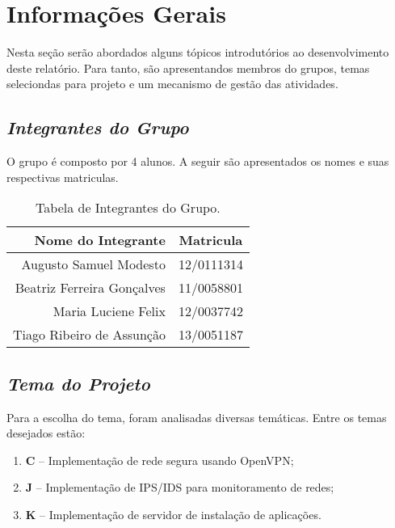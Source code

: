 \chapter[Informações Gerais]{Informações Gerais}
\label{chap:informacoesGerais}
	
	Nesta seção serão abordados alguns tópicos introdutórios ao desenvolvimento deste relatório. Para tanto, são apresentandos membros do grupos, temas seleciondas para projeto e um mecanismo de gestão das atividades.

	\section[Integrantes do Grupo]{\emph{Integrantes do Grupo}}
	\label{sec:informacoesGerais_integrantes}

		O grupo é composto por 4 alunos. A seguir são apresentados os nomes e suas respectivas matriculas.

		\label{subsubsec:informacoesGerais_integrantes_tables}
		\begin{table}[h]
			\centering 
			\begin{tabular}{r|c}

				Nome do Integrante & Matricula \\
				
				\hline

				Augusto Samuel Modesto & 12/0111314 \\
				Beatriz Ferreira Gonçalves  & 11/0058801 \\
				Maria Luciene Felix & 12/0037742 \\
				Tiago Ribeiro de Assunção & 13/0051187 \\
				
			\end{tabular}
			\caption[Tabela de Integrantes do Grupo]{Tabela de Integrantes do Grupo.}
			\label{tab:informacoesGerais_integrantes_.tables}
		\end{table}

	\section[Tema do Projeto]{\emph{Tema do Projeto}}
	\label{sec:informacoesGerais_tema}

		Para a escolha do tema, foram analisadas diversas temáticas. Entre os temas desejados estão:

		\begin{enumerate}
			\item{\textbf{C} – Implementação de rede segura usando OpenVPN;}
			\item{\textbf{J} – Implementação de IPS/IDS para monitoramento de redes;}
			\item{\textbf{K} – Implementação de servidor de instalação de aplicações.}
		\end{enumerate}


